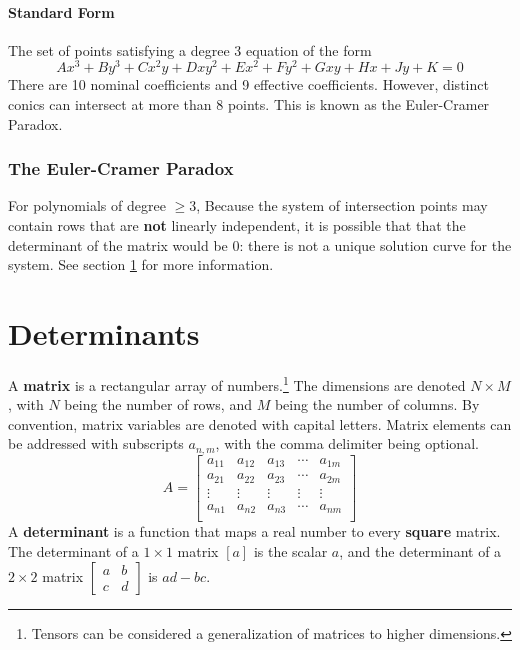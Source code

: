 \documentclass{article}
\begin{document}
\paragraph{Standard Form} The set of points satisfying a degree 3 equation of the form $$Ax^3 + By^3 + Cx^2y + Dxy^2 + Ex^2 + Fy^2 + Gxy + Hx + Jy + K = 0$$
There are 10 nominal coefficients and 9 effective coefficients. However, distinct conics can intersect at more than 8 points. This is known as the Euler-Cramer Paradox.

\subsubsection{The Euler-Cramer Paradox}
For polynomials of degree $\ge 3$, Because the system of intersection points may contain rows that are \textbf{not} linearly independent, it is possible that that the determinant of the matrix would be $0$: there is not a unique solution curve for the system. See section \ref{determinant} for more information.

\section{Determinants} \label{determinant}
A \textbf{matrix} is a rectangular array of numbers.\footnote{Tensors can be considered a generalization of matrices to higher dimensions.} The dimensions are denoted $N \times M$, with $N$ being the number of rows, and $M$ being the number of columns. By convention, matrix variables are denoted with capital letters. Matrix elements can be addressed with subscripts $a_{n,m}$, with the comma delimiter being optional.
$$A = \begin{bmatrix}
 a_{11} & a_{12} & a_{13} & \cdots & a_{1m} \\
 a_{21} & a_{22} & a_{23} & \cdots & a_{2m} \\
 \vdots & \vdots & \vdots & \vdots & \vdots \\
 a_{n1} & a_{n2} & a_{n3} & \cdots & a_{nm} \\
\end{bmatrix}$$
A \textbf{determinant} is a function that maps a real number to every \textbf{square} matrix.
The determinant of a $1\times1$ matrix $\left[a\right]$ is the scalar $a$, and the determinant of a $2\times2$ matrix $\left[\begin{smallmatrix} a & b \\ c & d \end{smallmatrix}\right]$ is $ad - bc$.
\end{document}
